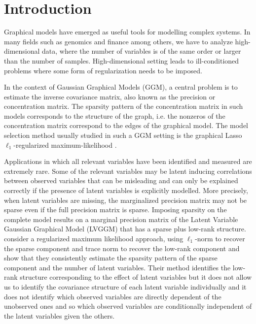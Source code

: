 \section{Introduction}
\label{intro}


Graphical models have emerged as useful tools for modelling complex systems. In many fields such as genomics and finance among others, we have to analyze high-dimensional data, where the number of variables is of the same order or larger than the number of samples.  High-dimensional setting leads to ill-conditioned problems where some form of regularization needs to be imposed.

In the context of Gaussian Graphical Models (GGM), a central problem is to estimate the inverse covariance matrix, also known as the precision or concentration matrix. The sparsity pattern of the concentration matrix in such models corresponds to the structure of the graph, i.e. the nonzeros of the concentration matrix correspond to the edges of the graphical model. The model selection method usually studied in such a GGM setting is the graphical Lasso $\ell_1$-regularized maximum-likelihood \citep{friedman2008sparse,yuan2007model,banerjee2008model}.

Applications in which all relevant variables have been identified and measured are extremely rare. Some of the relevant variables may be latent inducing correlations between observed variables that can be misleading and can only be explained correctly if the presence of latent variables is explicitly modelled. More precisely, when latent variables are missing, the marginalized precision matrix may not be sparse even if the full precision matrix is sparse. Imposing sparsity on the complete model results on a marginal precision matrix of the Latent Variable Gaussian Graphical Model (LVGGM) that has a sparse plus low-rank structure. \citet{chandrasekaran2010} consider a regularized maximum likelihood approach, using $\ell_1$-norm to recover the sparse component and trace norm to recover the low-rank component and show that they consistently estimate the sparsity pattern of the sparse component and the number of latent variables. Their method identifies the low-rank structure corresponding to the effect of latent variables but it does not allow us to identify the covariance structure of each latent variable individually and it does not identify which observed variables are directly dependent of the unobserved ones and so which observed variables are conditionally independent of the latent variables given the others.


